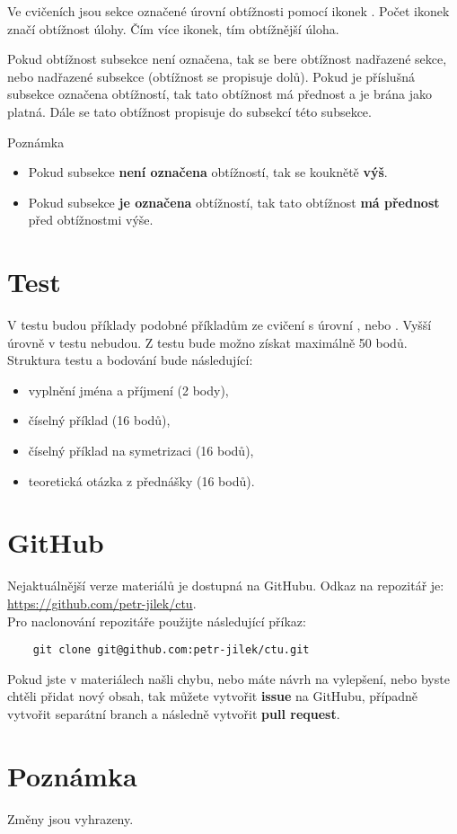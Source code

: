 \documentclass{article}
\begin{document}
Ve cvičeních jsou sekce označené úrovní obtížnosti pomocí ikonek \spicy. Počet ikonek značí obtížnost úlohy. Čím více ikonek, tím obtížnější úloha.

Pokud obtížnost subsekce není označena, tak se bere obtížnost nadřazené sekce, nebo nadřazené subsekce (obtížnost se propisuje dolů). Pokud je příslušná subsekce označena obtížností, tak tato obtížnost má přednost a je brána jako platná. Dále se tato obtížnost propisuje do subsekcí této subsekce.

\begin{notebox}{Poznámka}
    \begin{itemize}
        \item Pokud subsekce \textbf{není označena} obtížností, tak se kouknětě \textbf{výš}.
        \item Pokud subsekce \textbf{je označena} obtížností, tak tato obtížnost \textbf{má přednost} před obtížnostmi výše.
    \end{itemize}
\end{notebox}




\section{Test}
V testu budou příklady podobné příkladům ze cvičení s úrovní \spicy, nebo \spicy \spicy. Vyšší úrovně v testu nebudou. Z testu bude možno získat maximálně 50 bodů. Struktura testu a bodování bude následující:
\begin{itemize}
    \item vyplnění jména a příjmení (2 body),
    \item číselný příklad (16 bodů),
    \item číselný příklad na symetrizaci (16 bodů),
    \item teoretická otázka z přednášky (16 bodů).
\end{itemize}




\section{GitHub}
Nejaktuálnější verze materiálů je dostupná na GitHubu. Odkaz na repozitář je: \href{https://github.com/petr-jilek/ctu}{https://github.com/petr-jilek/ctu}.\\

Pro naclonování repozitáře použijte následující příkaz:
\begin{verbatim}
    git clone git@github.com:petr-jilek/ctu.git
\end{verbatim}

Pokud jste v materiálech našli chybu, nebo máte návrh na vylepšení, nebo byste chtěli přidat nový obsah, tak můžete vytvořit \textbf{issue} na GitHubu, případně vytvořit separátní branch a následně vytvořit \textbf{pull request}.




\section{Poznámka}
Změny jsou vyhrazeny.
\end{document}

